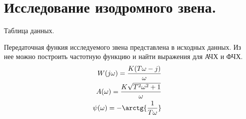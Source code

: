 \documentclass[a4paper, 11pt]{article}
\begin{document}
\section*{Исследование изодромного звена.}
\begin{minipage}[t]{0.6\textwidth}
    \vspace{-0.7cm}
    \begin{table}[H]
        \centering
        \caption{Таблица данных.}
    \end{table}
\end{minipage}
\begin{minipage}[t]{0.4\textwidth}
    Передаточная функия исследуемого звена представлена в исходных данных. Из нее можно построить частотную функцию и найти выражения для АЧХ и ФЧХ.
    \begin{align}
        W(j\omega) = \frac{K(T\omega - j)}{\omega} \\
        A(\omega) = \frac{K\sqrt{T^2\omega^2 + 1}}{\omega} \\
        \psi(\omega) = -\arctg{\frac{1}{T\omega}}
    \end{align}
\end{minipage}
\end{document}
